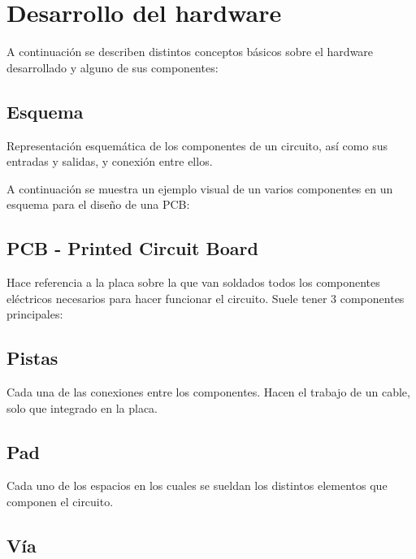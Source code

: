 \section{Desarrollo del hardware}\label{desarrollo_del_hardware}

A continuación se describen distintos conceptos básicos sobre el hardware desarrollado y alguno de sus componentes:

\subsection{Esquema}\label{esquema}

Representación esquemática de los componentes de un circuito, así como sus entradas y salidas, y conexión entre ellos.

A continuación se muestra un ejemplo visual de un varios componentes en un esquema para el diseño de una PCB:


\subsection{PCB - Printed Circuit Board}\label{pcb_printed_circuit_board}

Hace referencia a la placa sobre la que van soldados todos los componentes eléctricos necesarios para hacer funcionar el circuito. Suele tener 3 componentes principales:

\subsection{Pistas}\label{pistas}

Cada una de las conexiones entre los componentes. Hacen el trabajo de un cable, solo que integrado en la placa.


\subsection{Pad}\label{pad}

Cada uno de los espacios en los cuales se sueldan los distintos  elementos que componen el circuito.


\subsection{Vía}\label{via}

